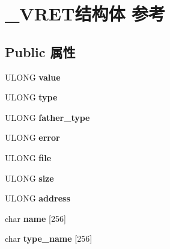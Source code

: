 \hypertarget{struct___v_r_e_t}{}\section{\+\_\+\+V\+R\+E\+T结构体 参考}
\label{struct___v_r_e_t}
\subsection*{Public 属性}
\begin{DoxyCompactItemize}
\item 
\mbox{\label{struct___v_r_e_t_a317c6af6af009b9e8473fe3c070e4f9f}} 
U\+L\+O\+NG {\bfseries value}
\item 
\mbox{\label{struct___v_r_e_t_aaccec82f045aaf7e5d0fb393bd245ad0}} 
U\+L\+O\+NG {\bfseries type}
\item 
\mbox{\label{struct___v_r_e_t_ae0425cc61300ebab681afa942349364c}} 
U\+L\+O\+NG {\bfseries father\+\_\+type}
\item 
\mbox{\label{struct___v_r_e_t_a2a66a24cbab67da9ce001079c59bd064}} 
U\+L\+O\+NG {\bfseries error}
\item 
\mbox{\label{struct___v_r_e_t_a969de59d311d7d89e46a0da8cfe37a06}} 
U\+L\+O\+NG {\bfseries file}
\item 
\mbox{\label{struct___v_r_e_t_a946bc5fed58f8ed4931534e1e3eb357b}} 
U\+L\+O\+NG {\bfseries size}
\item 
\mbox{\label{struct___v_r_e_t_aff8f6cf7e598643a4d1398b57eb80f5b}} 
U\+L\+O\+NG {\bfseries address}
\item 
\mbox{\label{struct___v_r_e_t_a75dd17a6e7c631b80a2b246c355de96c}} 
char {\bfseries name} \mbox{[}256\mbox{]}
\item 
\mbox{\label{struct___v_r_e_t_ad629ba7e5aa3d09ccc4b85c904206282}} 
char {\bfseries type\+\_\+name} \mbox{[}256\mbox{]}
\item 
\mbox{\label{struct___v_r_e_t_a206a589378f69c62647c1696858aafa7}} 

\end{DoxyCompactItemize}
